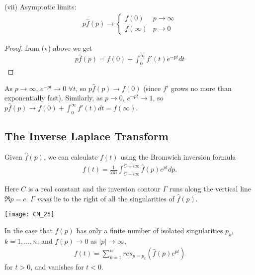 \documentclass[a4paper]{article}
\begin{document}
(vii) Asymptotic limits:
\begin{equation*}
\begin{aligned}
p \hat{f}(p) \to \left\{\begin{array}{ll}
f(0) & p \to \infty\\
f(\infty) & p \to 0
\end{array}\right.
\end{aligned}
\end{equation*}
\begin{proof}
from (v) above we get
\begin{equation*}
\begin{aligned}
p \hat{f}(p) = f(0) + \int_0^\infty f'(t) e^{-pt} dt
\end{aligned}
\end{equation*}
\end{proof}
As $p \to \infty$, $e^{-pt} \to 0$ $\forall t$, so $p\hat{f}(p) \to f(0)$ (since $f'$ grows no more than exponentially fast). Similarly, as $p \to 0$, $e^{-pt} \to 1$, so $p\hat{f}(p) \to f(0) + \int_0^\infty f'(t) dt = f(\infty)$.

\subsection{The Inverse Laplace Transform}
Given $\hat{f}(p)$, we can calculate $f(t)$ using the Bromwich inversion formula
\begin{equation*}
\begin{aligned}
f(t) = \frac{1}{2\pi i} \int_{C-i\infty}^{C+i\infty} \hat{f}(p) e^{pt} dp.
\end{aligned}
\end{equation*}

Here $C$ is a real constant and the inversion contour $\Gamma$ runs along the vertical line $\Re p = c$. $\Gamma$ \emph{must} lie to the right of all the singularities of $\hat{f}(p)$.

\texttt{[image: CM\_25]}

In the case that $\hat{f}(p)$ has only a finite number of isolated singularities $p_k$, $k=1,...,n$, and $f(p) \to 0$ as $|p| \to \infty$,
\begin{equation*}
\begin{aligned}
f(t) = \sum_{k=1}^n res_{p=p_k} (\hat{f}(p) e^{pt})
\end{aligned}
\end{equation*}
for $t>0$, and vanishes for $t<0$.
\end{document}
